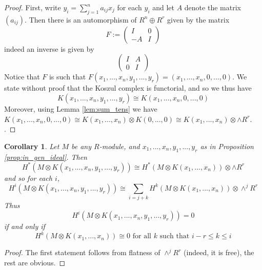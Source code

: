 \documentclass[12pt]{article}
\theoremstyle{plain}
\newtheorem{cor}[thm]{Corollary}
\theoremstyle{definition}
\begin{document}
	\begin{proof}
		First, write $y_i = \sum_{j = 1}^n a_{ij}x_j$ for each $y_i$ and let $A$ denote the matrix $(a_{ij})$. Then there is an automorphism of $R^n \oplus R^r$ given by the matrix
		\begin{equation}
			F:= \begin{pmatrix}
				I & 0\\
				-A & I
			\end{pmatrix}
		\end{equation}
		indeed an inverse is given by
		\begin{equation}
			\begin{pmatrix}
				I & A\\
				0 & I
			\end{pmatrix}
		\end{equation}
		Notice that $F$ is such that $F(x_1,...,x_n,y_1,...,y_r) = (x_1,...,x_n,0,...,0)$.  We state without proof that the Koszul complex is functorial, and so we thus have
		\begin{equation}
			K(x_1,...,x_n,y_1,...,y_r) \cong K(x_1,...,x_n,0,...,0)
		\end{equation}
		Moreover, using Lemma \ref{lem:sum_tens} we have $K(x_1,...,x_n,0,...,0) \cong K(x_1,...,x_n) \otimes K(0,...,0) \cong K(x_1,...,x_n) \otimes \wedge R^r$. .
	\end{proof}
	\begin{cor}
		Let $M$ be any $R$-module, and $x_1,...,x_n,y_1,...,y_r$ as in Proposition \ref{prop:in_gen_ideal}. Then
		\begin{equation}
			H^\ast (M \otimes K(x_1,...,x_n,y_1,...,y_r))\cong H^\ast(M \otimes K(x_1,...,x_n)) \otimes \wedge R^r
		\end{equation}
		and so for each $i$,
		\begin{equation}
			H^i(M \otimes K(x_1,...,x_n,y_1,...,y_r)) \cong \sum_{i = j + k}H^k(M \otimes K(x_1,...,x_n)) \otimes \wedge^j R^r
		\end{equation}
		Thus
		\begin{equation}
			H^i(M \otimes K(x_1,...,x_n,y_1,...,y_r)) = 0
		\end{equation}
		if and only if
		\begin{equation}
			H^k(M \otimes K(x_1,...,x_n)) \cong 0\text{ for all }k\text{ such that }i-r \leq k \leq i
		\end{equation}
	\end{cor}
	\begin{proof}
		The first statement follows from flatness of $\wedge^j R^r$ (indeed, it is free), the rest are obvious.
	\end{proof}
	
\end{document}
